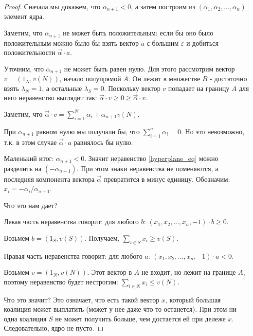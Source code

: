 \documentclass[pdftex,12pt,a4paper]{article}
\numberwithin{equation}{page} %
\theoremstyle{definition} %
\theoremstyle{definition}
\theoremstyle{definition}
\begin{document}
\begin{proof}
Сначала мы докажем, что $\alpha_{n+1}<0$, а затем построим из $(\alpha_{1},\alpha_{2},...,\alpha_{n})$ элемент ядра.

Заметим, что $\alpha_{n+1}$ не может быть положительным: если бы оно было положительным можно было бы взять вектор $a$ с большим $\varepsilon$ и добиться положительности $\vec{\alpha}\cdot a$.

Уточним, что $\alpha_{n+1}$ не может быть равен нулю. Для этого рассмотрим вектор $v=(1_{N},v(N))$, начало полупрямой $A$. Он лежит в множестве $B$ - достаточно взять $\lambda_{N}=1$, а остальные $\lambda_{S}=0$. Поскольку вектор $v$ попадает на границу $A$ для него неравенство выглядит так: $\vec{\alpha}\cdot v \geq 0 \geq \vec{\alpha}\cdot v$.

Заметим, что $\vec{\alpha}\cdot v=\sum_{i=1}^{N}\alpha_{i}+\alpha_{n+1}v(N)$.

При $\alpha_{n+1}$ равном нулю мы получали бы, что $\sum_{i=1}^{n}\alpha_{i}=0$. Но это невозможно, т.к. в этом случае $\vec{\alpha}\cdot a$ равнялось бы нулю.

Маленький итог: $\alpha_{n+1}<0$. Значит неравенство \ref{hyperplane_eq} можно разделить на $(-\alpha_{n+1})$. При этом знаки неравенства не поменяются, а последняя компонента вектора $\vec{\alpha}$ превратится в минус единицу. Обозначим: $x_{i}=-\alpha_{i}/\alpha_{n+1}$.

Что это нам дает?

Левая часть неравенства говорит: для любого $b$: $(x_{1},x_{2},...,x_{n},-1)\cdot b \geq 0$.

Возьмем $b=(1_{S},v(S))$. Получаем, $\sum_{i\in S}x_{i}\geq v(S)$.

Правая часть неравенства говорит: для любого $a$: $(x_{1},x_{2},...,x_{n},-1)\cdot a <0$.

Возьмем $v=(1_{N},v(N))$. Этот вектор в $A$ не входит, но лежит на границе $A$, поэтому неравенство будет нестрогим: $\sum_{i\in N}x_{i}\leq v(N)$.

Что это значит? Это означает, что есть такой вектор $x$, который большая коалиция может выплатить (может у нее даже что-то останется). При этом ни одна коалиция $S$ не может получить больше, чем достается ей при дележе $x$. Следовательно, ядро не пусто.

\end{proof}
\end{document}
